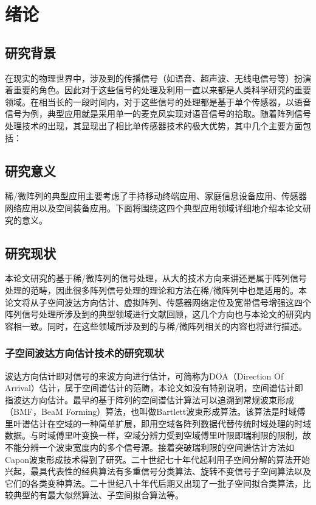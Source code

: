 \chapter{绪论}
\section{研究背景}
在现实的物理世界中\cite{texbook}，涉及到的传播信号\cite{ctex-doc}（如语音、超声波、无线电信号等）扮演着重要的角色。因此对于这些信号的处理及利用一直以来都是人类科学研究的重要领域。在相当长的一段时间内，对于这些信号的处理都是基于单个传感器，以语音信号为例，典型应用就是采用单一的麦克风实\cite{hyperref-doc}现对语音信号的拾取。随着阵列信号处理技术的出现，其显现出了相比单传感器技术的极大优势，其中几个主要方面包括：
\section{研究意义}
稀/微阵列的典型应用主要考虑了手持移动终端应用、家庭信息设备应用、传感器网络应用以及空间装备应用。下面将围绕这四个典型应用领域详细地介绍本论文研究的意义。
\section{研究现状}
本论文研究的基于稀/微阵列的信号处理，从大的技术方向来讲还是属于阵列信号处理的范畴，因此很多阵列信号处理的理论和方法在稀/微阵列中也是适用的。本论文将从子空间波达方向估计、虚拟阵列、传感器网络定位及宽带信号增强这四个阵列信号处理所涉及到的典型领域进行文献回顾，这几个方向也与本论文的研究内容相一致。同时，在这些领域所涉及到的与稀/微阵列相关的内容也将进行描述。
\subsection{子空间波达方向估计技术的研究现状}
波达方向估计即对信号的来波方向进行估计，可简称为DOA（Direction Of Arrival）估计，属于空间谱估计的范畴，本论文如没有特别说明，空间谱估计即指波达方向估计。最早的基于阵列的空间谱估计算法可以追溯到常规波束形成（BMF，BeaM Forming）算法，也叫做Bartlett波束形成算法。该算法是时域傅里叶谱估计在空域的一种简单扩展，即用空域各阵列数据代替传统时域处理的时域数据。与时域傅里叶变换一样，空域分辨力受到空域傅里叶限即瑞利限的限制，故不能分辨一个波束宽度内的多个信号源。接着突破瑞利限的空间谱估计方法如Capon波束形成技术得到了研究。二十世纪七十年代起利用子空间分解的算法开始兴起，最具代表性的经典算法有多重信号分类算法、旋转不变信号子空间算法以及它们的各类变种算法。二十世纪八十年代后期又出现了一批子空间拟合类算法，比较典型的有最大似然算法、子空间拟合算法等。


